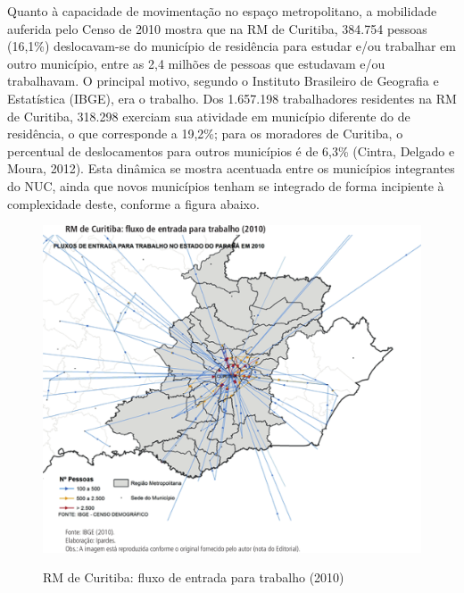 	Quanto à capacidade de movimentação no espaço metropolitano, a mobilidade auferida pelo Censo de 2010 mostra que na RM de Curitiba, 384.754 pessoas (16,1\%) deslocavam-se do município de residência para estudar e/ou trabalhar em outro município, entre as 2,4 milhões de pessoas que estudavam e/ou trabalhavam. O principal motivo, segundo o Instituto Brasileiro de Geografia e Estatística (IBGE), era o trabalho. Dos 1.657.198 trabalhadores residentes na RM de Curitiba, 318.298 exerciam sua atividade em município diferente do de residência, o que corresponde a 19,2\%; para os moradores de Curitiba, o percentual de deslocamentos para outros municípios é de 6,3\% (Cintra, Delgado e Moura, 2012). Esta dinâmica se mostra acentuada entre os municípios integrantes do NUC, ainda que novos municípios tenham se integrado de forma incipiente à complexidade deste, conforme a figura abaixo.
	
	\begin{figure}
		\centering
		\caption{RM de Curitiba: fluxo de entrada para trabalho (2010)}
		\includegraphics[width=1.0\linewidth]{img/costa2015a_05}
		\label{fig:costa2015a_05}
	\end{figure}

